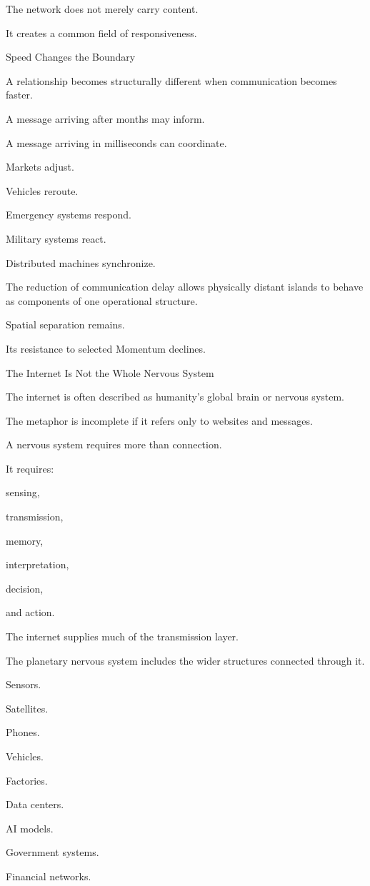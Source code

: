 The network does not merely carry content.

It creates a common field of responsiveness.

Speed Changes the Boundary

A relationship becomes structurally different when communication becomes faster.

A message arriving after months may inform.

A message arriving in milliseconds can coordinate.

Markets adjust.

Vehicles reroute.

Emergency systems respond.

Military systems react.

Distributed machines synchronize.

The reduction of communication delay allows physically distant islands to behave as components of one operational structure.

Spatial separation remains.

Its resistance to selected Momentum declines.

The Internet Is Not the Whole Nervous System

The internet is often described as humanity’s global brain or nervous system.

The metaphor is incomplete if it refers only to websites and messages.

A nervous system requires more than connection.

It requires:

sensing,

transmission,

memory,

interpretation,

decision,

and action.

The internet supplies much of the transmission layer.

The planetary nervous system includes the wider structures connected through it.

Sensors.

Satellites.

Phones.

Vehicles.

Factories.

Data centers.

AI models.

Government systems.

Financial networks.

